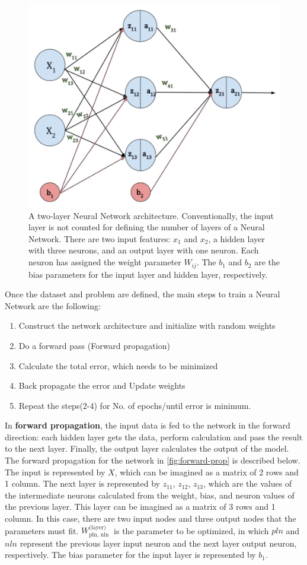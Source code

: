 \begin{figure}[h]
	\centering
	\includegraphics[width=0.7\linewidth]{images/approaches/deep_learning/forwardpass.jpg}
	\caption[footnote-3d]{A two-layer Neural Network architecture. Conventionally, the input layer is not counted for defining the number of layers of a Neural Network.
	There are two input features: $x_1$ and $x_2$, a hidden layer with three neurons, and an output layer with one neuron.
	Each neuron has assigned the weight parameter $W_{ij}$. The $b_1$ and $b_2$ are the bias parameters for the input layer and hidden layer, respectively.}
	\label{fig:forward-prop}
\end{figure}

\noindent Once the dataset and problem are defined, the main steps to train a Neural Network are the following:
\begin{enumerate}[Step 1:]
\item Construct the network architecture and initialize with random weights
\item Do a forward pass (Forward propagation)
\item Calculate the total error, which needs to be minimized
\item Back propagate the error and Update weights
\item Repeat the steps(2-4) for No. of epochs/until error is minimum.
\end{enumerate}

\noindent In \textbf{forward propagation}, the input data is fed to the network in the forward direction: each hidden layer gets the data, perform calculation and pass the result to the next layer.
Finally, the output layer calculates the output of the model.\\
The forward propagation for the network in \autoref{fig:forward-prop} is described below.
The input is represented by $X$, which can be imagined as a matrix of 2 rows and 1 column.
The next layer is represented by $z_{11}$, $z_{12}$, $z_{13}$, which are the values of the intermediate neurons calculated from the weight, bias, and neuron values of the previous layer.
This layer can be imagined as a matrix of 3 rows and 1 column.
In this case, there are two input nodes and three output nodes that the parameters must fit. $W_{\text {pln, nln }}^{\text {(layer) }}$ is the parameter to be optimized, in which $pln$ and $nln$ represent the previous layer input neuron and the next layer output neuron, respectively.
The bias parameter for the input layer is represented by $b_1$.

